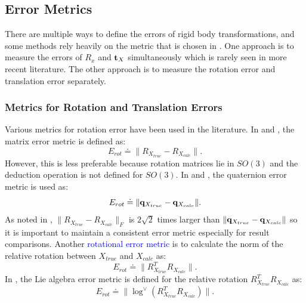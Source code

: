\documentclass[twocolumn,10pt]{asme2ej}
\begin{document}
\subsection{Error Metrics}
There are multiple ways to define the errors of rigid body transformations, and some methods rely heavily on the metric that is chosen in \cite{strobl2006optimal}. One approach is to measure the errors of $R_{x}$ and ${\bf t}_{X}$ simultaneously which is rarely seen in more recent literature. The other approach is to measure the rotation error and translation error separately. 
\subsubsection{ Metrics for Rotation and Translation Errors}
Various metrics for rotation error have been used in the literature. In \cite{tsai1989new} and \cite{horaud1995hand}, the matrix error metric is defined as: 
\begin{equation}
E_{rot} \doteq \| R_{X_{true}} - R_{X_{calc}} \|.
\end{equation}
However, this is less preferable because rotation matrices lie in $SO(3)  $ and the deduction operation is not defined for $SO(3)$.
In \cite{daniilidis1999hand} and \cite{andreff1999line}, the quaternion error metric is used as:
\begin{equation}
E_{rot} \doteq \|{\bf q}_{X_{true}} - {\bf q}_{X_{calc}}\|.
\end{equation}
As noted in \cite{daniilidis1996dual}, $\| R_{X_{true}} - R_{X_{calc}}\|_F$ is $2\sqrt{2}$ times larger than $\|{\bf q}_{X_{true}} - {\bf q}_{X_{calc}} \|$ so it is important to maintain a consistent error metric especially for result comparisons. 
Another \textcolor{blue}{rotational error metric} %
 is to calculate the norm of the relative rotation between $X_{true}$ and $X_{calc}$ as:
\begin{equation}
E_{rot} \doteq \|R^{T}_{X_{true}}R_{X_{calc}}\|.
\end{equation} 
In \cite{ackermanGSI}, the Lie algebra error metric is defined for the relative rotation $R^{T}_{X_{true}}R_{X_{calc}}$ as:
\begin{equation} 
E_{rot} \doteq \|\log^{\vee}(R_{X_{true}}^TR_{X_{calc}})\|.
\label{RotError}
\end{equation}
\end{document}
